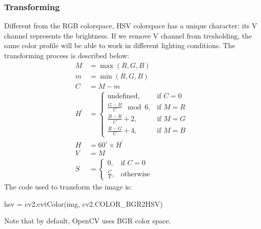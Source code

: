 \subsubsection{Transforming}
Different from the RGB colorspace, HSV colorspace has a unique character: its V channel represents the brightness. If we remove V channel from tresholding, the same color profile will be able to work in different lighting conditions.
The transforming process is described below\cite{cite4}:
\begin{align}
  M &= \operatorname{max}(R, G, B) \\
  m &= \operatorname{min}(R, G, B) \\
  C &= M - m\\
  H^\prime &=
    \begin{cases}
      \mathrm{undefined},        &\mbox{if } C = 0 \\
      \frac{G - B}{C} \;\bmod 6, &\mbox{if } M = R \\
      \frac{B - R}{C} + 2,       &\mbox{if } M = G \\
      \frac{R - G}{C} + 4,       &\mbox{if } M = B
    \end{cases} \\
  H        &= 60^\circ \times H^\prime\\
  V &= M\\
   S &=
    \begin{cases}
      0,           &\mbox{if } C = 0 \\
      \frac{C}{V}, &\mbox{otherwise}
    \end{cases}
\end{align}
The code used to transform the image is:
\begin{python}
hsv = cv2.cvtColor(img, cv2.COLOR_BGR2HSV)
\end{python}
Note that by default, OpenCV uses BGR color space.
